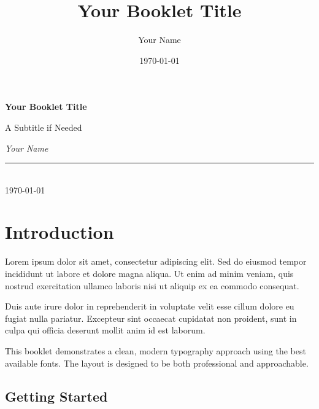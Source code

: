 \documentclass[11pt,twoside,openright]{book}
\title{Your Booklet Title}
\author{Your Name}
\date{\today}
\begin{document}
\begin{titlepage}
    \centering
    \vspace*{2cm}
    
    {\huge\bfseries\color{darkblue} Your Booklet Title \par}
    \vspace{1cm}
    {\Large A Subtitle if Needed \par}
    
    \vspace{3cm}
    {\Large\itshape Your Name \par}
    
    \vfill
    
    \begin{center}
        \rule{4cm}{0.5pt} \\[0.5cm]
        {\large \today}
    \end{center}
    
    \vspace{2cm}
\end{titlepage}

\tableofcontents
\cleardoublepage


\chapter{Introduction}

Lorem ipsum dolor sit amet, consectetur adipiscing elit. Sed do eiusmod tempor incididunt ut labore et dolore magna aliqua. Ut enim ad minim veniam, quis nostrud exercitation ullamco laboris nisi ut aliquip ex ea commodo consequat.

Duis aute irure dolor in reprehenderit in voluptate velit esse cillum dolore eu fugiat nulla pariatur. Excepteur sint occaecat cupidatat non proident, sunt in culpa qui officia deserunt mollit anim id est laborum.

This booklet demonstrates a clean, modern typography approach using the best available fonts. The layout is designed to be both professional and approachable.

\section{Getting Started}
\end{document}
